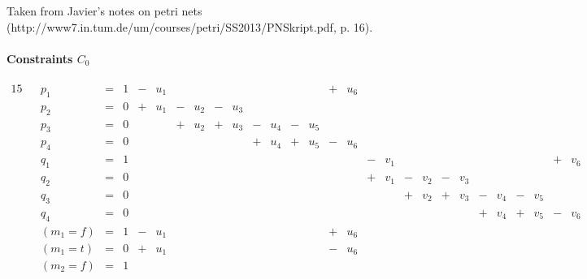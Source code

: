 \documentclass{article}
\begin{document}
Taken from Javier's notes on petri nets
(http://www7.in.tum.de/um/courses/petri/SS2013/PNSkript.pdf, p. 16).

\paragraph{Constraints $C_0$}

\begin{alignat*}{15}
&& p_1 &{}={}& 1
  &{}-{}& u_1 &     &     &     &     &     &     &     &     &{}+{}& u_6 
  &     &     &     &     &     &     &     &     &     &     &     &     \\
&& p_2 &{}={}& 0
  &{}+{}& u_1 &{}-{}& u_2 &{}-{}& u_3 &     &     &     &     &     &     
  &     &     &     &     &     &     &     &     &     &     &     &     \\
&& p_3 &{}={}& 0
  &     &     &{}+{}& u_2 &{}+{}& u_3 &{}-{}& u_4 &{}-{}& u_5 &     &     
  &     &     &     &     &     &     &     &     &     &     &     &     \\
&& p_4 &{}={}& 0
  &     &     &     &     &     &     &{}+{}& u_4 &{}+{}& u_5 &{}-{}& u_6
  &     &     &     &     &     &     &     &     &     &     &     &     \\
&& q_1 &{}={}& 1
  &     &     &     &     &     &     &     &     &     &     &     &     
  &{}-{}& v_1 &     &     &     &     &     &     &     &     &{}+{}& v_6 \\
&& q_2 &{}={}& 0
  &     &     &     &     &     &     &     &     &     &     &     &    
  &{}+{}& v_1 &{}-{}& v_2 &{}-{}& v_3 &     &     &     &     &     &     \\
&& q_3 &{}={}& 0
  &     &     &     &     &     &     &     &     &     &     &     &     
  &     &     &{}+{}& v_2 &{}+{}& v_3 &{}-{}& v_4 &{}-{}& v_5 &     &     \\
&& q_4 &{}={}& 0
  &     &     &     &     &     &     &     &     &     &     &     &     
  &     &     &     &     &     &     &{}+{}& v_4 &{}+{}& v_5 &{}-{}& v_6 \\
&& (m_1=f) &{}={}& 1
  &{}-{}& u_1 &     &     &     &     &     &     &     &     &{}+{}& u_6     
  &     &     &     &     &     &     &     &     &     &     &     &     \\
&& (m_1=t) &{}={}& 0
  &{}+{}& u_1 &     &     &     &     &     &     &     &     &{}-{}& u_6     
  &     &     &     &     &     &     &     &     &     &     &     &     \\
&& (m_2=f) &{}={}& 1
  &     &     &     &     &     &     &     &     &     &     &     &     

\end{alignat*}
\end{document}
